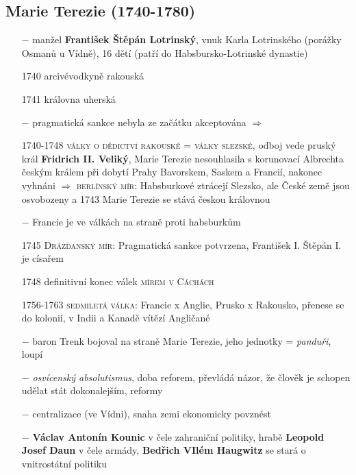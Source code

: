 \documentclass{article}
\begin{document}
\subsection*{Marie Terezie (1740-1780)}
\begin{itemize}
    \vspace{-0.5em}
    \setlength\itemsep{0.15em}
    \item[$-$] manžel \textbf{František Štěpán Lotrinský}, vnuk Karla Lotrinského (porážky Osmanů u Vídně), 16 dětí (patří do Habsbursko-Lotrinské dynastie)
    \item[1740] arcivévodkyně rakouská
    \item[1741] královna uherská
    \item[$-$] pragmatická sankce nebyla ze začátku akceptována $\Rightarrow$
    \item[1740-1748] \textsc{války o dědictví rakouské} = \textsc{války slezské}, odboj vede pruský král \textbf{Fridrich II. Veliký}, Marie Terezie nesouhlasila s korunovací Albrechta českým králem při dobytí Prahy Bavorskem, Saskem a Francií, nakonec vyhnáni $\Rightarrow$ \textsc{berlínský mír}: Habsburkové ztrácejí Slezsko, ale České země jsou osvobozeny a 1743 Marie Terezie se stává českou královnou
    \item[$-$] Francie je ve válkách na straně proti habsburkům
    \item[1745] \textsc{Drážďanský mír}: Pragmatická sankce potvrzena, František I. Štěpán I. je císařem
    \item[1748] definitivní konec válek \textsc{mírem v Cáchách}
    \item[1756-1763] \textsc{sedmiletá válka}: Francie x Anglie, Prusko x Rakousko, přenese se do kolonií, v Indii a Kanadě vítězí Angličané
    \item[$-$] baron Trenk bojoval na straně Marie Terezie, jeho jednotky = \textit{panduři}, loupí
    \item[$-$] \textit{osvícenský absolutismus}, doba reforem, převládá názor, že člověk je schopen udělat stát dokonalejším, reformy
    \item[$-$] centralizace (ve Vídni), snaha zemi ekonomicky povznést
    \item[$-$] \textbf{Václav Antonín Kounic} v čele zahraniční politiky, hrabě \textbf{Leopold Josef Daun} v čele armády, \textbf{Bedřich VIlém Haugwitz} se stará o vnitrostátní politiku
\end{itemize}
\end{document}
